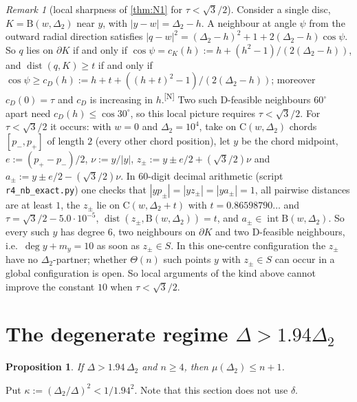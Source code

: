 \documentclass[11pt]{amsart}
\newtheorem{proposition}[theorem]{Proposition}
\theoremstyle{definition}
\theoremstyle{remark}
\newtheorem{remark}[theorem]{Remark}
\newcommand{\Dt}{\Delta_2}
\newcommand{\mult}{\mu}
\newcommand{\dist}{\operatorname{dist}}
\newcommand{\Cc}{\mathrm{C}}      %
\newcommand{\Dd}{\mathrm{B}}      %
\newcommand{\chk}[1]{\textsuperscript{[#1]}}
\begin{document}
\begin{remark}[local sharpness of \cref{thm:N1} for $\tau<\sqrt3/2$]\label{rem:sharp}
Consider a single disc, $K=\Dd(w,\Dt)$ near $y$, with $|y-w|=\Dt-h$. A neighbour at angle $\psi$ from the outward radial direction satisfies $|q-w|^2=(\Dt-h)^2+1+2(\Dt-h)\cos\psi$. So $q$ lies on $\partial K$ if and only if $\cos\psi=c_K(h):=h+(h^2-1)/(2(\Dt-h))$, and $\dist(q,K)\ge t$ if and only if $\cos\psi\ge c_D(h):=h+t+((h+t)^2-1)/(2(\Dt-h))$; moreover $c_D(0)=\tau$ and $c_D$ is increasing in $h$.\chk{N} Two such D-feasible neighbours $60^\circ$ apart need $c_D(h)\le\cos30^\circ$, so this local picture requires $\tau<\sqrt3/2$. For $\tau<\sqrt3/2$ it occurs: with $w=0$ and $\Dt=10^4$, take on $\Cc(w,\Dt)$ chords $[p_-,p_+]$ of length $2$ (every other chord position), let $y$ be the chord midpoint, $e:=(p_+-p_-)/2$, $\nu:=y/|y|$, $z_\pm:=y\pm e/2+(\sqrt3/2)\nu$ and $a_\pm:=y\pm e/2-(\sqrt3/2)\nu$. In $60$-digit decimal arithmetic (script \texttt{r4\_nb\_exact.py}) one checks that $|yp_\pm|=|yz_\pm|=|ya_\pm|=1$, all pairwise distances are at least $1$, the $z_\pm$ lie on $\Cc(w,\Dt+t)$ with $t=0.86598790\ldots$ and $\tau=\sqrt3/2-5.0\cdot10^{-5}$, $\dist(z_\pm,\Dd(w,\Dt))=t$, and $a_\pm\in\operatorname{int}\Dd(w,\Dt)$. So every such $y$ has degree $6$, two neighbours on $\partial K$ and two D-feasible neighbours, i.e.\ $\deg y+m_y=10$ as soon as $z_\pm\in S$. In this one-centre configuration the $z_\pm$ have no $\Dt$-partner; whether $\Theta(n)$ such points $y$ with $z_\pm\in S$ can occur in a global configuration is open. So local arguments of the kind above cannot improve the constant $10$ when $\tau<\sqrt3/2$.
\end{remark}
\section{The degenerate regime \texorpdfstring{$\Delta>1.94\Dt$}{Delta > 1.94 Delta2}}\label{sec:degenerate}

\begin{proposition}\label{prop:degenerate}
If $\Delta>1.94\,\Dt$ and $n\ge4$, then $\mult(\Dt)\le n+1$.
\end{proposition}

Put $\kappa:=(\Dt/\Delta)^2<1/1.94^2$. Note that this section does not use $\delta$.
\end{document}
